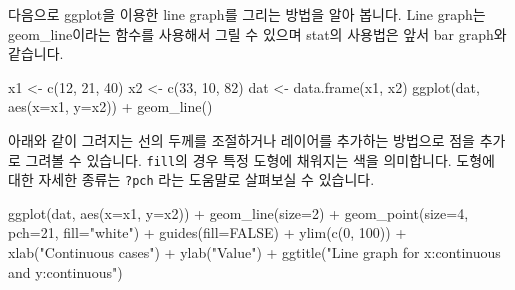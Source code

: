\documentclass[
]{book}
\newenvironment{Shaded}{\begin{snugshade}}{\end{snugshade}}
\newcommand{\AttributeTok}[1]{\textcolor[rgb]{0.77,0.63,0.00}{#1}}
\newcommand{\ConstantTok}[1]{\textcolor[rgb]{0.00,0.00,0.00}{#1}}
\newcommand{\DecValTok}[1]{\textcolor[rgb]{0.00,0.00,0.81}{#1}}
\newcommand{\FunctionTok}[1]{\textcolor[rgb]{0.00,0.00,0.00}{#1}}
\newcommand{\NormalTok}[1]{#1}
\newcommand{\OtherTok}[1]{\textcolor[rgb]{0.56,0.35,0.01}{#1}}
\newcommand{\SpecialCharTok}[1]{\textcolor[rgb]{0.00,0.00,0.00}{#1}}
\newcommand{\StringTok}[1]{\textcolor[rgb]{0.31,0.60,0.02}{#1}}
\begin{document}
다음으로 ggplot을 이용한 line graph를 그리는 방법을 알아 봅니다. Line graph는 geom\_line이라는 함수를 사용해서 그릴 수 있으며 stat의 사용법은 앞서 bar graph와 같습니다.

\begin{Shaded}
\begin{Highlighting}[]
\NormalTok{x1 }\OtherTok{\textless{}{-}} \FunctionTok{c}\NormalTok{(}\DecValTok{12}\NormalTok{, }\DecValTok{21}\NormalTok{, }\DecValTok{40}\NormalTok{)}
\NormalTok{x2 }\OtherTok{\textless{}{-}} \FunctionTok{c}\NormalTok{(}\DecValTok{33}\NormalTok{, }\DecValTok{10}\NormalTok{, }\DecValTok{82}\NormalTok{)}
\NormalTok{dat }\OtherTok{\textless{}{-}} \FunctionTok{data.frame}\NormalTok{(x1, x2)}
\FunctionTok{ggplot}\NormalTok{(dat, }\FunctionTok{aes}\NormalTok{(}\AttributeTok{x=}\NormalTok{x1, }\AttributeTok{y=}\NormalTok{x2)) }\SpecialCharTok{+}
  \FunctionTok{geom\_line}\NormalTok{()}
\end{Highlighting}
\end{Shaded}

아래와 같이 그려지는 선의 두께를 조절하거나 레이어를 추가하는 방법으로 점을 추가로 그려볼 수 있습니다. \texttt{fill}의 경우 특정 도형에 채워지는 색을 의미합니다. 도형에 대한 자세한 종류는 \texttt{?pch} 라는 도움말로 살펴보실 수 있습니다.

\begin{Shaded}
\begin{Highlighting}[]
\FunctionTok{ggplot}\NormalTok{(dat, }\FunctionTok{aes}\NormalTok{(}\AttributeTok{x=}\NormalTok{x1, }\AttributeTok{y=}\NormalTok{x2)) }\SpecialCharTok{+}
  \FunctionTok{geom\_line}\NormalTok{(}\AttributeTok{size=}\DecValTok{2}\NormalTok{) }\SpecialCharTok{+}
  \FunctionTok{geom\_point}\NormalTok{(}\AttributeTok{size=}\DecValTok{4}\NormalTok{, }\AttributeTok{pch=}\DecValTok{21}\NormalTok{, }\AttributeTok{fill=}\StringTok{"white"}\NormalTok{) }\SpecialCharTok{+}
  \FunctionTok{guides}\NormalTok{(}\AttributeTok{fill=}\ConstantTok{FALSE}\NormalTok{) }\SpecialCharTok{+}
  \FunctionTok{ylim}\NormalTok{(}\FunctionTok{c}\NormalTok{(}\DecValTok{0}\NormalTok{, }\DecValTok{100}\NormalTok{)) }\SpecialCharTok{+}
  \FunctionTok{xlab}\NormalTok{(}\StringTok{"Continuous cases"}\NormalTok{) }\SpecialCharTok{+} \FunctionTok{ylab}\NormalTok{(}\StringTok{"Value"}\NormalTok{) }\SpecialCharTok{+}
  \FunctionTok{ggtitle}\NormalTok{(}\StringTok{"Line graph for x:continuous and y:continuous"}\NormalTok{)}
\end{Highlighting}
\end{Shaded}
\end{document}
